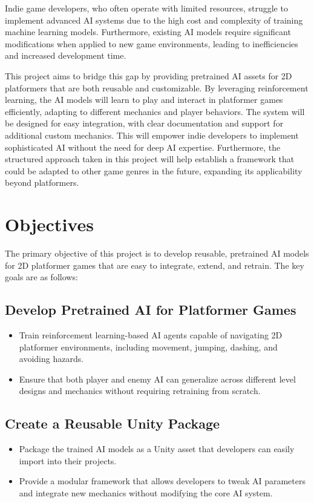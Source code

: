 \documentclass[12pt,oneside,openright,a4paper]{cpe-english-project}
\begin{document}
Indie game developers, who often operate with limited resources, struggle to implement advanced AI systems due to the high cost and complexity of training machine learning models. Furthermore, existing AI models require significant modifications when applied to new game environments, leading to inefficiencies and increased development time.\par

This project aims to bridge this gap by providing pretrained AI assets for 2D platformers that are both reusable and customizable. By leveraging reinforcement learning, the AI models will learn to play and interact in platformer games efficiently, adapting to different mechanics and player behaviors. The system will be designed for easy integration, with clear documentation and support for additional custom mechanics. This will empower indie developers to implement sophisticated AI without the need for deep AI expertise. Furthermore, the structured approach taken in this project will help establish a framework that could be adapted to other game genres in the future, expanding its applicability beyond platformers.\par

\section{Objectives}
The primary objective of this project is to develop reusable, pretrained AI models for 2D platformer games that are easy to integrate, extend, and retrain. The key goals are as follows:
\subsection{Develop Pretrained AI for Platformer Games}
\begin{itemize}
\item Train reinforcement learning-based AI agents capable of navigating 2D platformer environments, including movement, jumping, dashing, and avoiding hazards.
\item Ensure that both player and enemy AI can generalize across different level designs and mechanics without requiring retraining from scratch.
\end{itemize}
\subsection{Create a Reusable Unity Package}
\begin{itemize}
\item  Package the trained AI models as a Unity asset that developers can easily import into their projects.
\item  Provide a modular framework that allows developers to tweak AI parameters and integrate new mechanics without modifying the core AI system.
\end{itemize}
\end{document}
